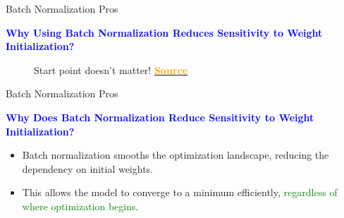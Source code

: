 \documentclass[serif, aspectratio=169]{beamer}
\begin{document}
\begin{frame}{Batch Normalization Pros}

    \textcolor{blue}{\textbf{Why Using Batch Normalization Reduces Sensitivity to Weight Initialization?}}

    \begin{figure}[h]
        \centering
        \caption{Start point doesn't matter! \href{https://www.linkedin.com/pulse/ways-improve-your-deep-learning-model-batch-adam-albuquerque-lima}{\textcolor{orange}{\textbf{Source}}}}
    \end{figure}
\end{frame}

\begin{frame}{Batch Normalization Pros}

    \textcolor{blue}{\textbf{Why Does Batch Normalization Reduce Sensitivity to Weight Initialization?}}
    \begin{itemize}
        \item Batch normalization smooths the optimization landscape, reducing the dependency on initial weights. 
        \item This allows the model to converge to a minimum efficiently, \textcolor{green}{regardless of where optimization begins}.
        


    \end{itemize}
\end{frame}
\end{document}
